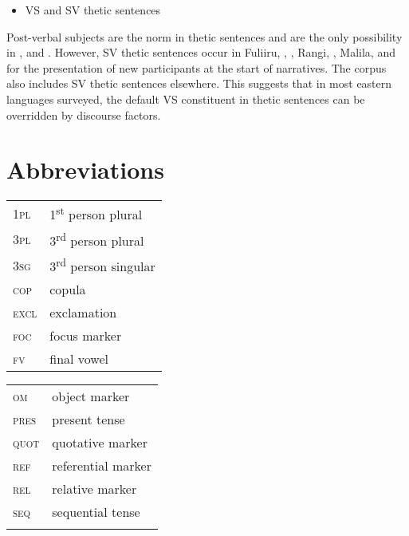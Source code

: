 \documentclass[output=paper]{langsci/langscibook}
\begin{document}
\begin{itemize}
\item VS and SV thetic sentences
\end{itemize}

Post-verbal subjects are the norm in thetic sentences and are the only possibility in ,  and . However, SV thetic sentences occur in Fuliiru, , , Rangi, , Malila, and  for the presentation of new participants at the start of narratives. The  corpus also includes SV thetic sentences elsewhere. This suggests that in most eastern  languages surveyed, the default VS constituent in thetic sentences can be overridden by discourse factors.

\section*{Abbreviations}

\begin{tabularx}{.45\textwidth}{lX}
\textsc{1pl} & 1\textsuperscript{st} person plural \\
\textsc{3pl} & 3\textsuperscript{rd} person plural \\
\textsc{3sg} & 3\textsuperscript{rd} person singular \\
\textsc{cop} & copula \\
\textsc{excl} & exclamation \\
\textsc{foc} & focus marker \\
\textsc{fv} & final vowel \\
\end{tabularx}
\begin{tabularx}{.45\textwidth}{lX}
\textsc{om} & object marker \\
\textsc{pres} & present tense \\
\textsc{quot} & quotative marker \\
\textsc{ref} & referential marker \\
\textsc{rel} & relative marker \\
\textsc{seq} & sequential tense \\
\\
\end{tabularx}



{\sloppy
\printbibliography[heading=subbibliography,notkeyword=this]
}
\end{document}
